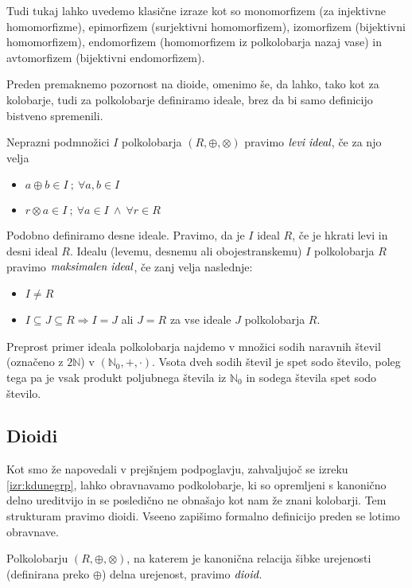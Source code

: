 \documentclass[mat1]{fmfdelo}
\newcommand{\N}{\mathbb{N}}
\newcommand{\No}{\N_0}
\newcommand{\pojem}[1]{\ensuremath{\emph{#1}}}
\begin{document}
Tudi tukaj lahko uvedemo klasične izraze kot so monomorfizem (za injektivne homomorfizme), epimorfizem (surjektivni homomorfizem), izomorfizem (bijektivni homomorfizem), endomorfizem (homomorfizem iz polkolobarja nazaj vase) in avtomorfizem (bijektivni endomorfizem).

Preden premaknemo pozornost na dioide, omenimo še, da lahko, tako kot za kolobarje, tudi za polkolobarje definiramo ideale, brez da bi samo definicijo bistveno spremenili.

\begin{definicija}
	Neprazni podmnožici $I$ polkolobarja $(R, \oplus, \otimes)$ pravimo \pojem{levi ideal}, če za njo velja \begin{itemize}
		\item $a \oplus b \in I~;~\forall a, b\in I$
		\item $r\otimes a \in I~;~\forall a\in I~\land~\forall r\in R$ 
	\end{itemize}
	Podobno definiramo desne ideale. Pravimo, da je $I$ ideal $R$, če je hkrati levi in desni ideal $R$.
	Idealu (levemu, desnemu ali obojestranskemu) $I$ polkolobarja $R$ pravimo \pojem{maksimalen ideal}, če zanj velja naslednje: \begin{itemize}
		\item $I \neq R$
		\item $I \subseteq J \subseteq R \Rightarrow I = J$ ali $J = R$ za vse ideale $J$ polkolobarja $R$.
	\end{itemize}
\end{definicija}
Preprost primer ideala polkolobarja najdemo v množici sodih naravnih števil (označeno z $2\N$) v $(\No, +, \cdot)$. Vsota dveh sodih števil je spet sodo število, poleg tega pa je vsak produkt poljubnega števila iz $\No$ in sodega števila spet sodo število.
\subsection{Dioidi}
Kot smo že napovedali v prejšnjem podpoglavju, zahvaljujoč se izreku \ref{izr:kdunegrp}, lahko obravnavamo podkolobarje, ki so opremljeni s kanonično delno ureditvijo in se posledično ne obnašajo kot nam že znani kolobarji. Tem strukturam pravimo dioidi. Vseeno zapišimo formalno definicijo preden se lotimo obravnave.
\begin{definicija}
	Polkolobarju $(R, \oplus, \otimes)$, na katerem je kanonična relacija šibke urejenosti (definirana preko $\oplus$) delna urejenost, pravimo \pojem{dioid}.
\end{definicija}
	
\end{document}
